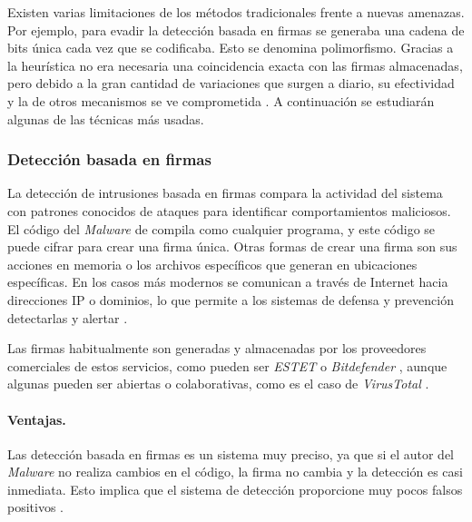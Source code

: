 \vspace{1em}

Existen varias limitaciones de los métodos tradicionales frente a nuevas amenazas. Por ejemplo, para evadir la detección basada en firmas se generaba una cadena de bits única cada vez que se codificaba. Esto se denomina polimorfismo. Gracias a la heurística no era necesaria una coincidencia exacta con las firmas almacenadas, pero debido a la gran cantidad de variaciones que surgen a diario, su efectividad y la de otros mecanismos se ve comprometida \cite{limitaciones}. A continuación se estudiarán algunas de las técnicas más usadas.

\subsubsection{Detección basada en firmas}
\label{subsubsec:firmas}

La detección de intrusiones basada en firmas compara la actividad del sistema con patrones conocidos de ataques para identificar comportamientos maliciosos. El código del \textit{Malware} de compila como cualquier programa, y este código se puede cifrar para crear una firma única. Otras formas de crear una firma son sus acciones en memoria o los archivos específicos que generan en ubicaciones específicas. En los casos más modernos se comunican a través de Internet hacia direcciones IP o dominios, lo que permite a los sistemas de defensa y prevención detectarlas y alertar \cite{firmas1}.

\vspace{1em}

Las firmas habitualmente son generadas y almacenadas por los proveedores comerciales de estos servicios, como pueden ser \textit{ESTET} \cite{eset} o \textit{Bitdefender} \cite{bitdefender}, aunque algunas pueden ser abiertas o colaborativas, como es el caso de \textit{VirusTotal} \cite{virustotal}.

\vspace{1em}

\paragraph*{\textbf{Ventajas.}}
Las detección basada en firmas es un sistema muy preciso, ya que si el autor del \textit{Malware} no realiza cambios en el código, la firma no cambia y la detección es casi inmediata. Esto implica que el sistema de detección proporcione muy pocos falsos positivos \cite{firmas1}.

